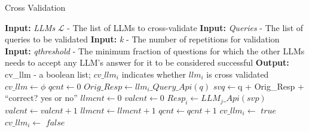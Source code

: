 \begin{algorithm}[tb]
\caption{Cross Validation}
\label{Cross Validation}
\begin{algorithmic}[1]
\Statex \textbf{Input:} \textit{LLMs} $\mathcal{L}$ - The list of LLMs to cross-validate
\Statex \textbf{Input:} \textit{Queries} - The list of queries to be validated
\Statex \textbf{Input:} \textit{k} - The number of repetitions for validation
\Statex \textbf{Input:} \textit{qthreshold} - The minimum fraction of questions for which the other LLMs needs to accept any LLM's answer for it to be considered successful
\Statex
\Statex \textbf{Output:} cv\_llm - a boolean list; $cv\_llm_i$ indicates whether $llm_i$ is cross validated
\Statex
{}
\State $cv\_llm \gets \phi$
    \State $qcnt \gets 0$
      \State $Orig\_Resp \gets llm_i\_Query\_Api(q)$
      \State $svq \gets $q + Orig\_Resp + ``correct? yes or no''
        \State $llmcnt \gets 0$
          \State $valcnt \gets 0$
            \State $Resp_i \gets LLM_j\_Api(svp)$
                \State $valcnt \gets valcnt + 1$
            \EndIf
          \EndFor
              \State $llmcnt \gets llmcnt + 1$
          \EndIf
        \EndFor
            \State $qcnt \gets qcnt + 1$
        \EndIf
    \EndFor
      \State $cv\_llm_i \gets$ {$true$}
    \Else
      \State $cv\_llm_i \gets$ {$false$}
    \EndIf
\EndFor
\State {}
\EndProcedure
\end{algorithmic}
\end{algorithm}

